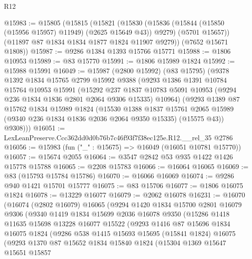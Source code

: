\begin{lexlean}{R12}
\begin{coremodule}
@15983 := @15805
    (@15815
      (@15821
        (@15830
          (@15836 (@15844 (@15850 (@15956 @15957) @11949) (@2625 @15649 @43)) @9279)
          (@5701 @15657))
        (@11897 @87 @1834 @1834 @1877 @1824 @11907 @9279))
      (@7652 @15671 @1808))
@15987 := @9286 @1384 @1393 @15766 @15771
@15988 := @1806 @10953
@15989 := @83 @15770
@15991 := @1806 @15989 @1824
@15992 := @15988 @15991
@16049 := @15987
    (@2800 @15992)
    (@83 @15795)
    (@9378
      @1392
      @1834
      @15765
      @2799
      @15992
      @9388
      (@9293
        @1386
        @1391
        @10784
        @15764
        @10953
        @15991
        (@15292
          @237
          @1837
          @10783
          @5091
          @10953
          (@9294 @236 @1834 @1836 @2801 @2064 @9306 @15335)
          @10964)
        (@9293
          @1389
          @87
          @15762
          @1834
          @15989
          @1824
          (@15530
            @1388
            @1837
            @15761
            @2065
            @15989
            (@9340 @236 @1834 @1836 @2036 @2064 @9350 @15335)
            (@15575 @43))
          @9308)))
@16051 := LexLeanPreserve.Ccc362dd0d0b76b7c46f93f7f38ec125e.R12.__rel_35 @2786
@16056 := @15983 (fun ("_" : @15675) => @16049 (@16051 @10781 @15770))
@16057 := @15674 @2055
@16064 := @3547 @2842 @53 @935 @1422 @1426 @15778 @15788
@16065 := @2208 @15783
@16066 := @16064 @16065
@16069 := @83 (@15793 @15784 @15786)
@16070 := @16066 @16069
@16074 := @9286 @940 @1421 @15701 @15777
@16075 := @83 @15706
@16077 := @1806 @16075 @1824
@16078 := @13229 @16077
@16079 := @2062 @16078
@16231 := @16070
    (@16074
      (@2802 @16079)
      @16065
      (@9294
        @1420
        @1834
        @15700
        @2801
        @16079
        @9306
        (@9340
          @1419
          @1834
          @15699
          @2036
          @16078
          @9350
          (@15286
            @1418
            @11635
            @15698
            @13228
            @16077
            @15522
            (@9293
              @1416
              @87
              @15696
              @1834
              @16075
              @1824
              (@9286
                @538
                @1415
                @15693
                @15695
                (@15841 @1824)
                @16075
                (@9293
                  @1370
                  @87
                  @15652
                  @1834
                  @15840
                  @1824
                  (@15304
                    @1369
                    @15647
                    @15651
                    @15857

\end{coremodule}
\end{lexlean}
